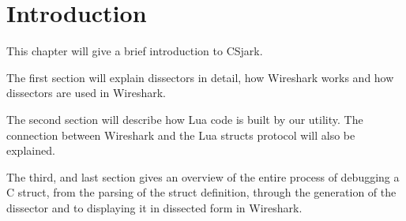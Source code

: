 \chapter{Introduction}

This chapter will give a brief introduction to CSjark.

The first section will explain dissectors in detail, how Wireshark works and how dissectors are used in Wireshark.

The second section will describe how Lua code is built by our utility. 
The connection between Wireshark and the Lua structs protocol will also be explained.

The third, and last section gives an overview of the entire process of debugging a C struct, from the parsing of the struct definition, through the
generation of the dissector and to displaying it in dissected form in Wireshark.
